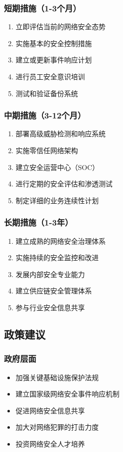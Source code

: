 \documentclass[12pt,a4paper]{article}
\begin{document}
\subsubsection{短期措施（1-3个月）}
\begin{enumerate}
    \item 立即评估当前的网络安全态势
    \item 实施基本的安全控制措施
    \item 建立或更新事件响应计划
    \item 进行员工安全意识培训
    \item 测试和验证备份系统
\end{enumerate}

\subsubsection{中期措施（3-12个月）}
\begin{enumerate}
    \item 部署高级威胁检测和响应系统
    \item 实施零信任网络架构
    \item 建立安全运营中心（SOC）
    \item 进行定期的安全评估和渗透测试
    \item 制定详细的业务连续性计划
\end{enumerate}

\subsubsection{长期措施（1-3年）}
\begin{enumerate}
    \item 建立成熟的网络安全治理体系
    \item 实施持续的安全监控和改进
    \item 发展内部安全专业能力
    \item 建立供应链安全管理体系
    \item 参与行业安全信息共享
\end{enumerate}

\subsection{政策建议}

\subsubsection{政府层面}
\begin{itemize}
    \item 加强关键基础设施保护法规
    \item 建立国家级网络安全事件响应机制
    \item 促进网络安全信息共享
    \item 加大对网络犯罪的打击力度
    \item 投资网络安全人才培养
\end{itemize}
\end{document}
